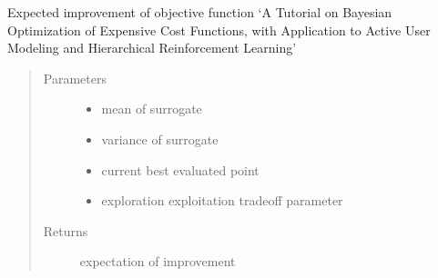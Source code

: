 \documentclass[letterpaper,12pt,english]{sphinxmanual}
\begin{document}
\begin{fulllineitems}
\label{\detokenize{PARyOpt:PARyOpt.acquisition_functions.expected_improvement}}
\sphinxAtStartPar
Expected improvement of objective function     ‘A Tutorial on Bayesian Optimization of Expensive Cost Functions,     with Application to Active User Modeling and Hierarchical Reinforcement Learning’
\begin{quote}\begin{description}
\item[{Parameters}] \leavevmode\begin{itemize}
\item {} 
\sphinxAtStartPar
{} \textendash{} mean of surrogate

\item {} 
\sphinxAtStartPar
{} \textendash{} variance of surrogate

\item {} 
\sphinxAtStartPar
{} \textendash{} current best evaluated point

\item {} 
\sphinxAtStartPar
{} \textendash{} exploration \sphinxhyphen{} exploitation tradeoff parameter

\end{itemize}

\item[{Returns}] \leavevmode
\sphinxAtStartPar
expectation of improvement

\end{description}\end{quote}

\end{fulllineitems}

\end{document}
